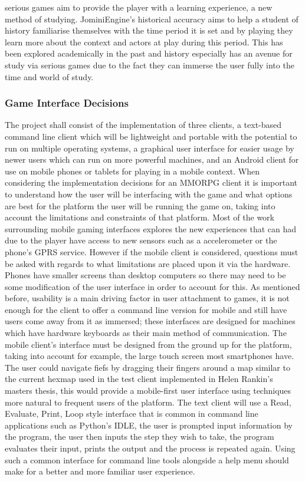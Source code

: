 \documentclass{article}
\begin{document}
serious games aim to provide the player with a learning experience, a new method of studying. JominiEngine's historical accuracy aims to help a student of history familiarise themselves with the time period it is set and by playing they learn more about the context and actors at play during this period. This has been explored academically in the past\cite{seriousgames} and history especially has an avenue for study via serious games due to the fact they can immerse the user fully into the time and world of study.
	\subsubsection{Game Interface Decisions}
	The project shall consist of the implementation of three clients, a text-based command line client which will be lightweight and portable with the potential to run on multiple operating systems, a graphical user interface for easier usage by newer users which can run on more powerful machines, and an Android client for use on mobile phones or tablets for playing in a mobile context. When considering the implementation decisions for an MMORPG client it is important to understand how the user will be interfacing with the game and what options are best for the platform the user will be running the game on, taking into account the limitations and constraints of that platform. Most of the work surrounding mobile gaming interfaces explores the new experiences that can had due to the player have access to new sensors such as a accelerometer or the phone's GPRS service. However if the mobile client is considered, questions must be asked with regards to what limitations are placed upon it via the hardware. Phones have smaller screens than desktop computers so there may need to be some modification of the user interface in order to account for this. As mentioned before, usability is a main driving factor in user attachment to games\cite{Christou:2012:EPP:2367616.2367630}, it is not enough for the client to offer a command line version for mobile and still have users come away from it as immersed; these interfaces are designed for machines which have hardware keyboards as their main method of communication. The mobile client's interface must be designed from the ground up for the platform, taking into account for example, the large touch screen most smartphones have. The user could navigate fiefs by dragging their fingers around a map similar to the current hexmap used in the test client implemented in Helen Rankin's masters thesis\cite{helenrankin}, this would provide a mobile-first user interface using techniques more natural to frequent users of the platform. The text client will use a Read, Evaluate, Print, Loop style interface that is common in command line applications such as Python's IDLE\cite{python}, the user is prompted input information by the program, the user then inputs the step they wish to take, the program evaluates their input, prints the output and the process is repeated again. Using such a common interface for command line tools alongside a help menu should make for a better and more familiar user experience.
\end{document}
